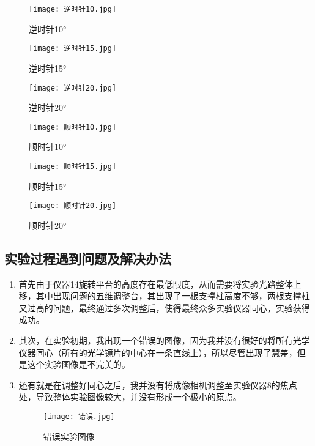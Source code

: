 \documentclass[dvipsnames, svgnames,a4paper,11pt]{article}
\begin{document}
  \begin{figure}[H]
	\begin{minipage}[b]{0.3\linewidth}
	  \centering
	  \texttt{[image: 逆时针10.jpg]}
	  \caption{逆时针10°}
	  \label{fig:sub1}
	\end{minipage}
	\hfill
	\begin{minipage}[b]{0.3\linewidth}
	  \centering
	  \texttt{[image: 逆时针15.jpg]}
	  \caption{逆时针15°}
	  \label{fig:sub2}
	\end{minipage}
	\hfill
	\begin{minipage}[b]{0.3\linewidth}
	  \centering
	  \texttt{[image: 逆时针20.jpg]}
	  \caption{逆时针20°}
	  \label{fig:sub3}
	\end{minipage}
  \end{figure}
  
  \begin{figure}[H]
	\begin{minipage}[b]{0.3\linewidth}
	  \centering
	  \texttt{[image: 顺时针10.jpg]}
	  \caption{顺时针10°}
	\end{minipage}
	\hfill
	\begin{minipage}[b]{0.3\linewidth}
	  \centering
	  \texttt{[image: 顺时针15.jpg]}
	  \caption{顺时针15°}
	\end{minipage}
	\hfill
	\begin{minipage}[b]{0.3\linewidth}
	  \centering
	  \texttt{[image: 顺时针20.jpg]}
	  \caption{顺时针20°}
	\end{minipage}
  \end{figure}


	
	\subsection{实验过程遇到问题及解决办法}
	\begin{enumerate}
		\item 首先由于仪器14旋转平台的高度存在最低限度，从而需要将实验光路整体上移，其中出现问题的五维调整台，其出现了一根支撑柱高度不够，两根支撑柱又过高的问题，最终通过多次调整后，使得最终众多实验仪器同心，实验获得成功。
		\item 其次，在实验初期，我出现一个错误的图像，因为我并没有很好的将所有光学仪器同心（所有的光学镜片的中心在一条直线上），所以尽管出现了慧差，但是这个实验图像是不完美的。
		\item 还有就是在调整好同心之后，我并没有将成像相机调整至实验仪器8的焦点处，导致整体实验图像较大，并没有形成一个极小的原点。
		
		
		
		\begin{figure}[H]
		\centering
		\texttt{[image: 错误.jpg]}
		\caption{错误实验图像}
		\label{错误实验图像}
		\end{figure}
	

	
	\end{enumerate}
	
\end{document}

